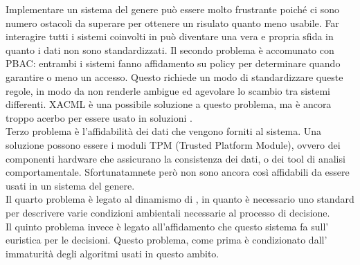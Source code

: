 Implementare un sistema del genere può essere molto frustrante poiché ci sono numero ostacoli da 
superare per ottenere un risulato quanto meno usabile.
Far interagire tutti i sistemi coinvolti in \radac può diventare una vera e propria sfida in quanto
i dati non sono standardizzati.
Il secondo problema è accomunato con PBAC: entrambi i sistemi fanno affidamento su policy per determinare quando garantire o meno un accesso. Questo richiede un modo 
di standardizzare queste regole, in modo da non renderle ambigue ed agevolare lo scambio tra sistemi differenti. XACML è una possibile soluzione a questo problema, ma è ancora troppo 
acerbo per essere usato in soluzioni \radac.\\
Terzo problema è l'affidabilità dei dati che vengono forniti al sistema. Una soluzione possono essere i moduli TPM (Trusted Platform Module), ovvero dei componenti hardware che assicurano la consistenza dei dati, o dei tool di analisi comportamentale. Sfortunatamnete però non sono ancora così affidabili da essere usati in un sistema del genere.\\
Il quarto problema è legato al dinamismo di \radac, in quanto è necessario uno 
standard per descrivere varie condizioni ambientali necessarie al processo
di decisione.\\
Il quinto problema invece è legato all'affidamento che questo sistema fa sull'
euristica per le decisioni. Questo problema, come prima è condizionato dall'
immaturità degli algoritmi usati in questo ambito.



